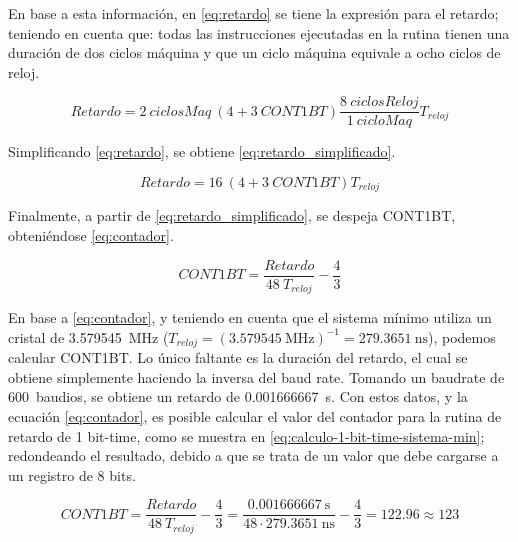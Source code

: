 \footnotesize

\normalsize

En base a esta información, en \eqref{eq:retardo} se tiene la expresión para el retardo; teniendo en cuenta que: todas las instrucciones ejecutadas en la rutina tienen una duración de dos ciclos máquina y que un ciclo máquina equivale a ocho ciclos de reloj.

\begin{equation}
    Retardo = 2\:ciclosMaq\:(4+3\:CONT1BT)\frac{8\:ciclosReloj}{1\:cicloMaq} T_{reloj}
    \label{eq:retardo}
\end{equation}

Simplificando \eqref{eq:retardo}, se obtiene \eqref{eq:retardo_simplificado}.

\begin{equation}
    Retardo = 16\:(4+3\:CONT1BT) T_{reloj}
    \label{eq:retardo_simplificado}
\end{equation}

Finalmente, a partir de \eqref{eq:retardo_simplificado}, se despeja CONT1BT, obteniéndose \eqref{eq:contador}.

\begin{equation}
    CONT1BT = \frac{Retardo}{48\:T_{reloj}}-\frac{4}{3}
    \label{eq:contador}
\end{equation}

En base a \eqref{eq:contador}, y teniendo en cuenta que el sistema mínimo utiliza un cristal de \num{3.579545}~\si{\mega\hertz} ($ T_{reloj} = \left(\num{3.579545}~\si{\mega\hertz}\right)^{-1} = \num{279.3651}~\si{\nano\second} $), podemos calcular CONT1BT. Lo único faltante es la duración del retardo, el cual se obtiene simplemente haciendo la inversa del baud rate. Tomando un baudrate de 600~baudios, se obtiene un retardo de \num{0.001666667}~\si{\second}. Con estos datos, y la ecuación \eqref{eq:contador}, es posible calcular el valor del contador para la rutina de retardo de 1 bit-time, como se muestra en \eqref{eq:calculo-1-bit-time-sistema-min}; redondeando el resultado, debido a que se trata de un valor que debe cargarse a un registro de 8 bits.

\begin{equation}
    CONT1BT = \frac{Retardo}{48\:T_{reloj}}-\frac{4}{3} = \frac{\num{0.001666667}~\si{\second}}{48\cdot\num{279.3651}~\si{\nano\second}}-\frac{4}{3} = \num{122.96}\approx\num{123}
    \label{eq:calculo-1-bit-time-sistema-min}
\end{equation}

